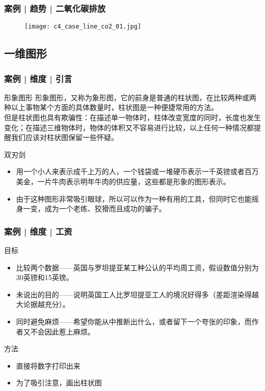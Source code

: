 \begin{frame}
  \frametitle{案例 | 趋势 | 二氧化碳排放}
    \begin{figure}
      \centering
      \texttt{[image: c4\_case\_line\_co2\_01.jpg]}
    \end{figure}
\end{frame}

\subsection{一维图形}
\begin{frame}
  \frametitle{案例 | 维度 | 引言}
  \begin{block}{形象图形}
    形象图形，又称为象形图，它的前身是普通的柱状图，在比较两种或两种以上事物某个方面的具体数量时，柱状图是一种便捷常用的方法。\\
但是\alert{柱状图也具有欺骗性}：在描述单一物体时，柱体改变宽度的同时，长度也发生变化；在描述三维物体时，物体的体积又不容易进行比较，以上任何一种情况都提醒我们应该对柱状图保留一些怀疑。\\
  \end{block}
  \pause
  \begin{block}{双刃剑}
    \begin{itemize}
      \item 用一个小人来表示成千上万的人，一个钱袋或一堆硬币表示一千英镑或者百万美金，一片牛肉表示明年牛肉的供应量，这些都是形象的图形表示。
      \item 由于这种图形非常吸引眼球，所以可以作为一种有用的工具，但同时它也能摇身一变，成为一个老练、狡猾而且成功的骗子。
    \end{itemize}
  \end{block}
\end{frame}

\begin{frame}
  \frametitle{案例 | 维度 | 工资}
  \begin{block}{目标}
    \begin{itemize}
      \item 比较两个数据——英国与罗坦提亚某工种公认的平均周工资，假设数值分别为30英镑和15英镑。
      \item 未说出的目的——说明英国工人比罗坦提亚工人的境况好得多（差距渲染得越大论据越充分）。
      \item 同时避免麻烦——希望你能从中推断出什么，或者留下一个夸张的印象，而作者又不会因此惹上麻烦。
    \end{itemize}
  \end{block}
  \pause
  \begin{block}{方法}
    \begin{itemize}
      \item 直接将数字打印出来
      \item 为了吸引注意，画出柱状图
    \end{itemize}
  \end{block}
\end{frame}


